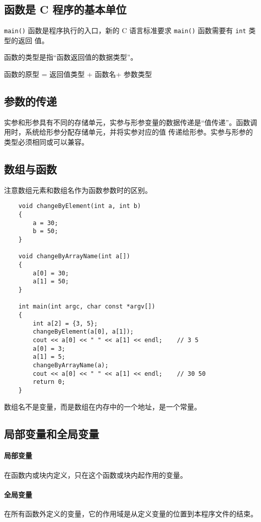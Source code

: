 \documentclass[UTF8]{ctexart}
\begin{document}
\subsection{函数是 C 程序的基本单位}
\texttt{main()} 函数是程序执行的入口，新的 C 语言标准要求 \texttt{main()} 函数需要有 \texttt{int} 类型的返回
值。

函数的类型是指“函数返回值的数据类型”。

函数的原型 = 返回值类型 + 函数名+ 参数类型

\subsection{参数的传递}
实参和形参具有不同的存储单元，实参与形参变量的数据传递是“值传递”。函数调用时，系统给形参分配存储单元，并将实参对应的值
传递给形参。实参与形参的类型必须相同或可以兼容。

\subsection{数组与函数}
注意数组元素和数组名作为函数参数时的区别。
\begin{verbatim}
    void changeByElement(int a, int b)
    {
        a = 30;
        b = 50;
    }

    void changeByArrayName(int a[])
    {
        a[0] = 30;
        a[1] = 50;
    }

    int main(int argc, char const *argv[])
    {
        int a[2] = {3, 5};
        changeByElement(a[0], a[1]);
        cout << a[0] << " " << a[1] << endl;    // 3 5
        a[0] = 3;
        a[1] = 5;
        changeByArrayName(a);
        cout << a[0] << " " << a[1] << endl;    // 30 50
        return 0;
    }
\end{verbatim}

数组名不是变量，而是数组在内存中的一个地址，是一个常量。

\subsection{局部变量和全局变量}
\paragraph{局部变量}
在函数内或块内定义，只在这个函数或块内起作用的变量。
\paragraph{全局变量}
在所有函数外定义的变量，它的作用域是从定义变量的位置到本程序文件的结束。
\end{document}
